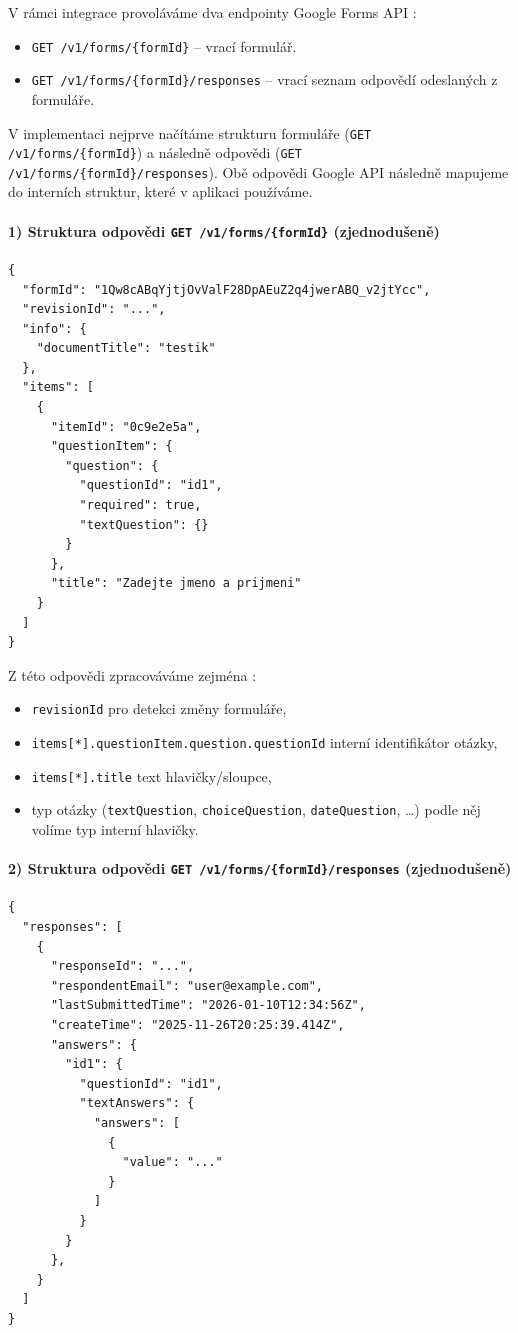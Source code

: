 V rámci integrace provoláváme dva endpointy Google Forms API \cite{google_forms_api_rest}:
\begin{itemize}
  \item \texttt{GET /v1/forms/\{formId\}} -- vrací formulář.
  \item \texttt{GET /v1/forms/\{formId\}/responses} -- vrací seznam odpovědí odeslaných z formuláře.
\end{itemize}

\noindent
V implementaci nejprve načítáme strukturu formuláře (\texttt{GET /v1/forms/\{formId\}}) a následně odpovědi (\texttt{GET /v1/forms/\{formId\}/responses}). Obě odpovědi Google API následně mapujeme do interních struktur, které v aplikaci používáme.

\paragraph{1) Struktura odpovědi \texttt{GET /v1/forms/\{formId\}} (zjednodušeně)}
\begin{verbatim}
{
  "formId": "1Qw8cABqYjtjOvValF28DpAEuZ2q4jwerABQ_v2jtYcc",
  "revisionId": "...",
  "info": {
    "documentTitle": "testik"
  },
  "items": [
    {
      "itemId": "0c9e2e5a",
      "questionItem": {
        "question": {
          "questionId": "id1",
          "required": true,
          "textQuestion": {}
        }
      },
      "title": "Zadejte jmeno a prijmeni"
    }
  ]
}
\end{verbatim}

\noindent
Z této odpovědi zpracováváme zejména \cite{google_forms_form_resource}:
\begin{itemize}
    \item \texttt{revisionId} \- pro detekci změny formuláře,
    \item \texttt{items[*].questionItem.question.questionId} \- interní identifikátor otázky,
    \item \texttt{items[*].title} \- text hlavičky/sloupce,
    \item typ otázky (\texttt{textQuestion}, \texttt{choiceQuestion}, \texttt{dateQuestion}, \dots) \- podle něj volíme typ interní hlavičky.
\end{itemize}

\paragraph{2) Struktura odpovědi \texttt{GET /v1/forms/\{formId\}/responses} (zjednodušeně)}
\begin{verbatim}
{
  "responses": [
    {
      "responseId": "...",
      "respondentEmail": "user@example.com",
      "lastSubmittedTime": "2026-01-10T12:34:56Z",
      "createTime": "2025-11-26T20:25:39.414Z",
      "answers": {
        "id1": {
          "questionId": "id1",
          "textAnswers": {
            "answers": [
              {
                "value": "..."
              }
            ]
          }
        }
      },
    }
  ]
}
\end{verbatim}

